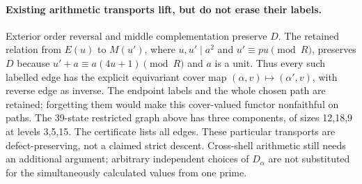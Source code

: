 \paragraph{Existing arithmetic transports lift, but do not erase their labels.}
Exterior order reversal and middle complementation preserve $D$.
The retained relation from $E(u)$ to $M(u')$, where $u,u'\mid a^2$ and
$u'\equiv pu\pmod R$, preserves $D$ because
$u'+a\equiv a(4u+1)\pmod R$ and $a$ is a unit.
Thus every such labelled edge has the explicit equivariant cover map
$(\alpha,v)\mapsto(\alpha',v)$, with reverse edge as inverse.
The endpoint labels and the whole chosen path are retained; forgetting
them would make this cover-valued functor nonfaithful on paths.
The 39-state restricted graph above has three components, of sizes
12,18,9 at levels 3,5,15. The certificate lists all edges.
These particular transports are defect-preserving, not a claimed
strict descent. Cross-shell arithmetic still needs an additional
argument; arbitrary independent choices of $D_\alpha$ are not substituted
for the simultaneously calculated values from one prime.
